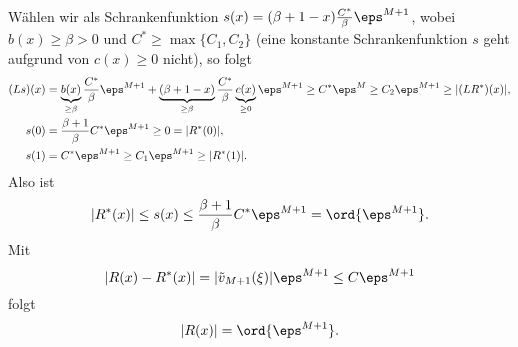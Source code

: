 Wählen wir als Schrankenfunktion $s(x)=(\beta+1-x)\frac{C^*}{\beta}\eps^{M+1}$, wobei $b(x)\geq\beta>0$ und $C^*\geq\max\{C_1,C_2\}$
(eine konstante Schrankenfunktion $s$ geht aufgrund von $c(x)\geq 0$ nicht),
so folgt
\begin{align*}
  (Ls)(x) &= \underbrace{b(x)}_{\geq\beta}\frac{C^*}{\beta}\eps^{M+1}+\underbrace{(\beta+1-x)}_{\geq\beta}\frac{C^*}{\beta}\underbrace{c(x)}_{\geq 0}\eps^{M+1}
  \geq C^*\eps^M
  \geq C_2\eps^{M+1}
  \geq |(LR^*)(x)|,\\
  s(0) &= \frac{\beta+1}{\beta}C^*\eps^{M+1}
  \geq 0=|R^*(0)|,\\
  s(1) &= C^*\eps^{M+1}
  \geq C_1\eps^{M+1}
  \geq |R^*(1)|.
\end{align*}
Also ist
\[
|R^*(x)|\leq s(x)\leq \frac{\beta+1}{\beta}C^*\eps^{M+1}=\ord{\eps^{M+1}}.
\]
Mit 
\[
|R(x)-R^*(x)|=|\tilde v_{M+1}(\xi)|\eps^{M+1}\leq C\eps^{M+1}
\]
folgt
\[    
|R(x)|=\ord{\eps^{M+1}}.
\]





